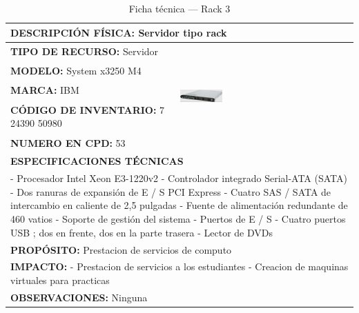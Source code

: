 \begin{table}[H]
\centering
\caption{Ficha técnica --- Rack 3}
\label{tab:rack-3}
\begin{tabular}{|p{}|p{}|}
\hline
\multicolumn{2}{|l|}{\textbf{DESCRIPCIÓN FÍSICA:} Servidor tipo rack} \\ \hline
\textbf{TIPO DE RECURSO:} Servidor & 
\multirow{5}{*}{\includegraphics[width=0.25\textwidth,height=4cm,keepaspectratio]{tablas-images/cp1/racks/rack-1.png}} \\ \cline{1-1}
\textbf{MODELO:} System x3250 M4 & \\ \cline{1-1}
\textbf{MARCA:} IBM & \\ \cline{1-1}
\textbf{CÓDIGO DE INVENTARIO:} 7 24390 50980 & \\ \cline{1-1}
\textbf{NUMERO EN CPD:} 53 & \\ \hline
\multicolumn{2}{|l|}{\textbf{ESPECIFICACIONES TÉCNICAS}} \\ \hline
\multicolumn{2}{|p{0.95\textwidth}|}{
\footnotesize
- Procesador Intel Xeon E3-1220v2
- Controlador integrado Serial-ATA (SATA)
- Dos ranuras de expansión de E / S PCI Express
- Cuatro SAS / SATA de intercambio en caliente de 2,5 pulgadas
- Fuente de alimentación redundante de 460 vatios
- Soporte de gestión del sistema
- Puertos de E / S
- Cuatro puertos USB ; dos en frente, dos en la parte trasera
- Lector de DVDs
} \\ \hline
\multicolumn{2}{|l|}{\textbf{PROPÓSITO:} Prestacion de servicios de computo} \\ \hline
\multicolumn{2}{|p{0.9\textwidth}|}{\textbf{IMPACTO:} - Prestacion de servicios a los estudiantes
- Creacion de maquinas virtuales para practicas} \\ \hline
\multicolumn{2}{|p{0.9\textwidth}|}{\textbf{OBSERVACIONES:} Ninguna} \\ \hline
\end{tabular}
\end{table}


